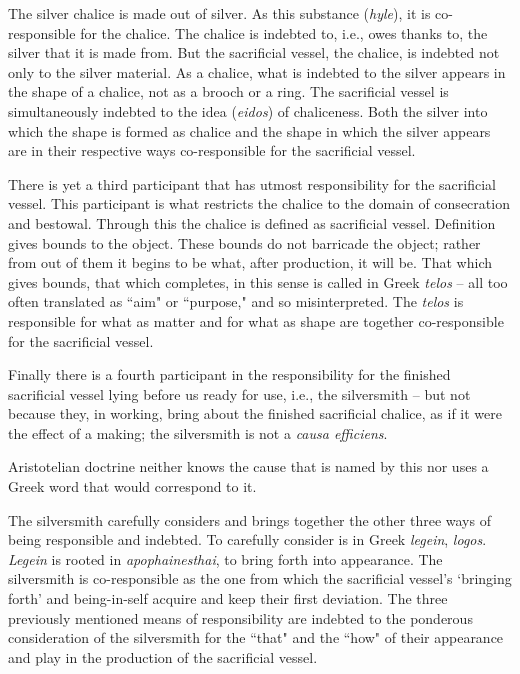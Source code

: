\documentclass[paper=a4, fontsize=11pt,twoside]{scrartcl}
\begin{document}
The silver chalice is made out of silver. As this substance (\textit{hyle}), it is co-responsible for the chalice. The chalice is indebted to, i.e., owes thanks to, the silver that it is made from. But the sacrificial vessel, the chalice, is indebted not only to the silver material. As a chalice, what is indebted to the silver appears in the shape of a chalice, not as a brooch or a ring. The sacrificial vessel is simultaneously indebted to the idea (\textit{eidos}) of chaliceness. Both the silver into which the shape is formed as chalice and the shape in which the silver appears are in their respective ways co-responsible for the sacrificial vessel.

There is yet a third participant that has utmost responsibility for the sacrificial vessel. This participant is what restricts the chalice to the domain of consecration and bestowal. Through this the chalice is defined as sacrificial vessel. Definition gives bounds to the object. These bounds do not barricade the object; rather from out of them it begins to be what, after production, it will be. That which gives bounds, that which completes, in this sense is called in Greek \textit{telos} -- all too often translated as ``aim" or ``purpose," and so misinterpreted. The \textit{telos} is responsible for what as matter and for what as shape are together co-responsible for the sacrificial vessel.

Finally there is a fourth participant in the responsibility for the finished sacrificial vessel lying before us ready for use, i.e., the silversmith -- but not because they, in working, bring about the finished sacrificial chalice, as if it were the effect of a making; the silversmith is not a \textit{causa efficiens}.

Aristotelian doctrine neither knows the cause that is named by this nor uses a Greek word that would correspond to it.

The silversmith carefully considers and brings together the other three ways of being responsible and indebted. To carefully consider is in Greek \textit{legein}, \textit{logos}. \textit{Legein} is rooted in \textit{apophainesthai}, to bring forth into appearance. The silversmith is co-responsible as the one from which the sacrificial vessel's `bringing forth' and being-in-self acquire and keep their first deviation. The three previously mentioned means of responsibility are indebted to the ponderous consideration of the silversmith for the ``that" and the ``how" of their appearance and play in the production of the sacrificial vessel.
\end{document}
